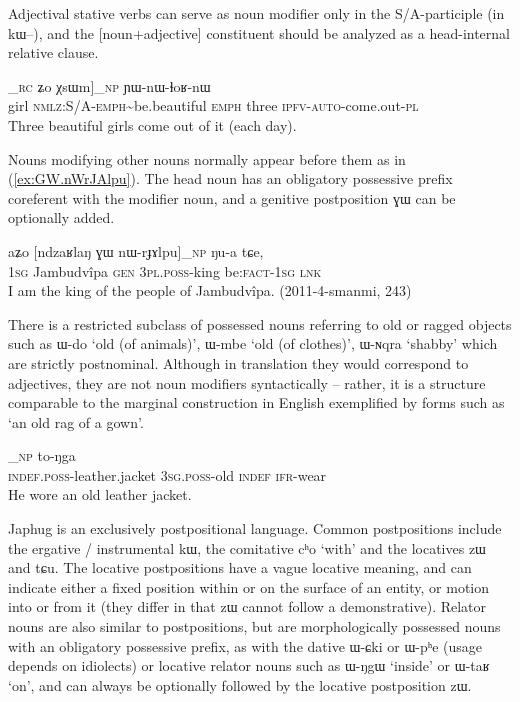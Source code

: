 \documentclass[oldfontcommands,oneside,a4paper,11pt]{article}
\newcommand{\ipa}[1]{{\phon#1}} %
\newcommand{\refb}[1]{(\ref{#1})}
\newcommand{\factual}[1]{\textsc{:fact}}
\begin{document}
Adjectival stative verbs can serve as noun modifier only in the S/A-participle (in \ipa{kɯ--}), and the [noun+adjective] constituent should be analyzed as a head-internal relative clause.

\begin{exe}
\ex \label{ex:tCheme.XsWm}
\gll
[[\ipa{tɕʰeme}^{head} 	\ipa{kɯ-mpɕɯ\textasciitilde{}mpɕɤr}]_{\textsc{rc}} 	\ipa{ʑo} 	\ipa{χsɯm}]_{\textsc{np}} 	\ipa{ɲɯ-nɯ-ɬoʁ-nɯ}  \\
girl \textsc{nmlz:S/A-emph}\textasciitilde{}be.beautiful \textsc{emph} three \textsc{ipfv-auto}-come.out-\textsc{pl} \\
\glt Three beautiful girls come out of it (each day).
\end{exe}

Nouns modifying other nouns normally appear before them as in \refb{ex:GW.nWrJAlpu}. The head noun has an obligatory possessive prefix coreferent with the modifier noun, and a genitive postposition \ipa{ɣɯ} can be optionally added.

\begin{exe}
\ex \label{ex:GW.nWrJAlpu}
\gll
\ipa{aʑo}  	[\ipa{ndzaʁlaŋ}  	\ipa{ɣɯ}  	\ipa{nɯ-rɟɤlpu}]_{\textsc{np}}  	\ipa{ŋu-a}  	\ipa{tɕe,}  
 \\
\textsc{1sg} Jambudvîpa \textsc{gen} \textsc{3pl.poss}-king  be\factual{}-\textsc{1sg} \textsc{lnk} \\
\glt I am the king of the people of Jambudvîpa. (2011-4-smanmi, 243)
\end{exe}

There is a  restricted subclass of possessed nouns referring to old or ragged objects such as \ipa{ɯ-do} `old (of animals)', \ipa{ɯ-mbe} `old (of clothes)', \ipa{ɯ-ɴqra} `shabby' which are strictly postnominal. Although in translation they would correspond to adjectives, they are not noun modifiers syntactically -- rather, it is a structure comparable to the marginal construction in English exemplified by forms such as `an old rag of a gown'.


\begin{exe}
\ex \label{ex:Wmbe}
\gll
[\ipa{tɯ-rcu} 	\ipa{ɯ-mbe} 	\ipa{ci}]_{\textsc{np}}	\ipa{to-ŋga} \\
\textsc{indef.poss}-leather.jacket \textsc{3sg.poss}-old \textsc{indef} \textsc{ifr}-wear \\
\glt He wore an old leather jacket.
\end{exe}

Japhug is an exclusively postpositional language. Common postpositions include the ergative / instrumental \ipa{kɯ}, the comitative \ipa{cʰo} `with' and the locatives \ipa{zɯ} and \ipa{tɕu}. The locative postpositions have a vague locative meaning, and can indicate either a fixed position within or on the surface of an entity, or motion into or from it (they differ in that \ipa{zɯ} cannot follow a demonstrative). Relator nouns are also similar to postpositions, but are morphologically possessed nouns with an obligatory possessive prefix, as with the dative \ipa{ɯ-ɕki} or \ipa{ɯ-pʰe} (usage depends on  idiolects) or locative relator nouns such as \ipa{ɯ-ŋgɯ} `inside' or \ipa{ɯ-taʁ} `on', and can always be optionally followed by the locative postposition \ipa{zɯ}.
\end{document}
